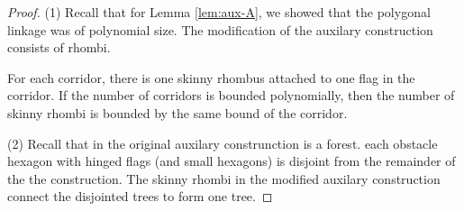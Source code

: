 \begin{proof}
\noindent (1) Recall that for Lemma \ref{lem:aux-A}, we showed that the polygonal linkage was of polynomial size.  The modification of the auxilary construction consists of rhombi.



For each corridor, there is one skinny rhombus attached to one flag in the corridor.  If the number of corridors is bounded polynomially, then the number of skinny rhombi is bounded by the same bound of the corridor.

\noindent (2) Recall that in the original auxilary construnction is a forest.
each obstacle hexagon with hinged flags (and small hexagons) is disjoint from the remainder of the the construction. 
The skinny rhombi in the modified auxilary construction connect the disjointed trees to form one tree.


\end{proof}
